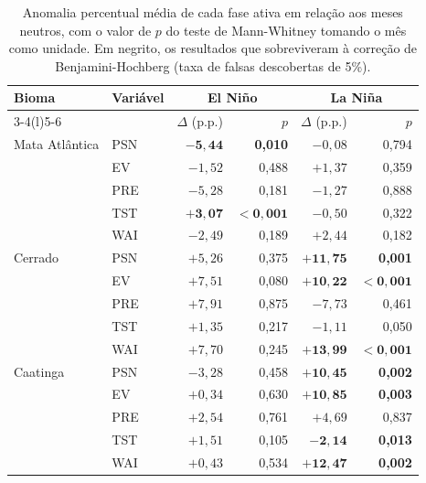 \documentclass[a4paper,fleqn]{cas-sc}
\begin{document}
\begin{table}[width=\textwidth,cols=7,pos=t]
\caption{Anomalia percentual média de cada fase ativa em relação aos meses neutros, com o valor de $p$ do teste de Mann-Whitney tomando o mês como unidade. Em negrito, os resultados que sobreviveram à correção de Benjamini-Hochberg (taxa de falsas descobertas de 5\%).}
\label{tab:convencional}
\begin{tabular*}{\tblwidth}{@{}llrrrr@{}}
\toprule
Bioma & Variável & \multicolumn{2}{c}{El Niño} & \multicolumn{2}{c}{La Niña} \\
\cmidrule(lr){3-4}\cmidrule(l){5-6}
 & & $\Delta$ (p.p.) & $p$ & $\Delta$ (p.p.) & $p$ \\
\midrule
Mata Atlântica & PSN & $\mathbf{-5{,}44}$ & \textbf{0,010} & $-0{,}08$ & 0,794 \\
               & EV  & $-1{,}52$ & 0,488 & $+1{,}37$ & 0,359 \\
               & PRE & $-5{,}28$ & 0,181 & $-1{,}27$ & 0,888 \\
               & TST & $\mathbf{+3{,}07}$ & $\mathbf{<0{,}001}$ & $-0{,}50$ & 0,322 \\
               & WAI & $-2{,}49$ & 0,189 & $+2{,}44$ & 0,182 \\
\addlinespace
Cerrado        & PSN & $+5{,}26$ & 0,375 & $\mathbf{+11{,}75}$ & \textbf{0,001} \\
               & EV  & $+7{,}51$ & 0,080 & $\mathbf{+10{,}22}$ & $\mathbf{<0{,}001}$ \\
               & PRE & $+7{,}91$ & 0,875 & $-7{,}73$ & 0,461 \\
               & TST & $+1{,}35$ & 0,217 & $-1{,}11$ & 0,050 \\
               & WAI & $+7{,}70$ & 0,245 & $\mathbf{+13{,}99}$ & $\mathbf{<0{,}001}$ \\
\addlinespace
Caatinga       & PSN & $-3{,}28$ & 0,458 & $\mathbf{+10{,}45}$ & \textbf{0,002} \\
               & EV  & $+0{,}34$ & 0,630 & $\mathbf{+10{,}85}$ & \textbf{0,003} \\
               & PRE & $+2{,}54$ & 0,761 & $+4{,}69$ & 0,837 \\
               & TST & $+1{,}51$ & 0,105 & $\mathbf{-2{,}14}$ & \textbf{0,013} \\
               & WAI & $+0{,}43$ & 0,534 & $\mathbf{+12{,}47}$ & \textbf{0,002} \\
\bottomrule
\end{tabular*}
\end{table}
\end{document}
